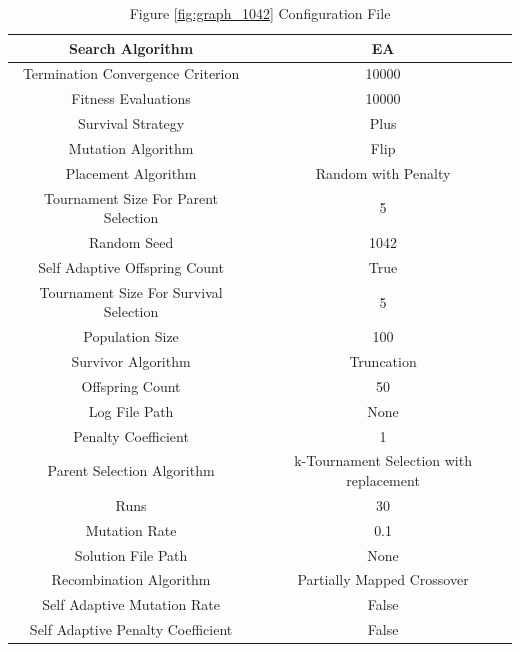\documentclass{standalone}
\begin{document}
\begin{table}[!htb]
	\centering
	\caption{Figure \ref{fig:graph_1042} Configuration File}
	\label{tab:graph_1042}
	\begin{tabular}{| c | c |}
		\hline
		Search Algorithm		& EA		 \\
		\hline
		Termination Convergence Criterion		& 10000		 \\
		\hline
		Fitness Evaluations		& 10000		 \\
		\hline
		Survival Strategy		& Plus		 \\
		\hline
		Mutation Algorithm		& Flip		 \\
		\hline
		Placement Algorithm		& Random with Penalty		 \\
		\hline
		Tournament Size For Parent Selection		& 5		 \\
		\hline
		Random Seed		& 1042		 \\
		\hline
		Self Adaptive Offspring Count		& True		 \\
		\hline
		Tournament Size For Survival Selection		& 5		 \\
		\hline
		Population Size		& 100		 \\
		\hline
		Survivor Algorithm		& Truncation		 \\
		\hline
		Offspring Count		& 50		 \\
		\hline
		Log File Path		& None		 \\
		\hline
		Penalty Coefficient		& 1		 \\
		\hline
		Parent Selection Algorithm		& k-Tournament Selection with replacement		 \\
		\hline
		Runs		& 30		 \\
		\hline
		Mutation Rate		& 0.1		 \\
		\hline
		Solution File Path		& None		 \\
		\hline
		Recombination Algorithm		& Partially Mapped Crossover		 \\
		\hline
		Self Adaptive Mutation Rate		& False		 \\
		\hline
		Self Adaptive Penalty Coefficient		& False		 \\
		\hline
	\end{tabular}
\end{table}
\end{document}
